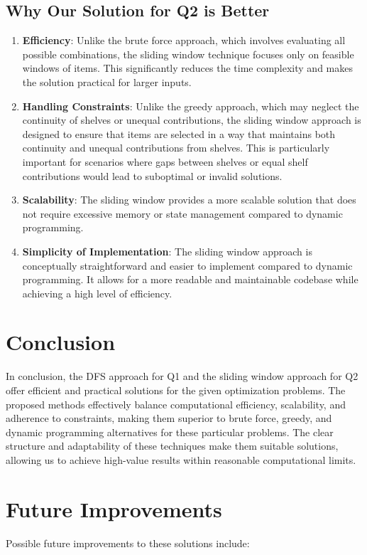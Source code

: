 \documentclass{article}
\begin{document}
\subsection{Why Our Solution for Q2 is Better}
\begin{enumerate}
    \item \textbf{Efficiency}: Unlike the brute force approach, which involves evaluating all possible combinations, the sliding window technique focuses only on feasible windows of items. This significantly reduces the time complexity and makes the solution practical for larger inputs.
    \item \textbf{Handling Constraints}: Unlike the greedy approach, which may neglect the continuity of shelves or unequal contributions, the sliding window approach is designed to ensure that items are selected in a way that maintains both continuity and unequal contributions from shelves. This is particularly important for scenarios where gaps between shelves or equal shelf contributions would lead to suboptimal or invalid solutions.
    \item \textbf{Scalability}: The sliding window provides a more scalable solution that does not require excessive memory or state management compared to dynamic programming.
    \item \textbf{Simplicity of Implementation}: The sliding window approach is conceptually straightforward and easier to implement compared to dynamic programming. It allows for a more readable and maintainable codebase while achieving a high level of efficiency.
\end{enumerate}

\section{Conclusion}
In conclusion, the DFS approach for Q1 and the sliding window approach for Q2 offer efficient and practical solutions for the given optimization problems. The proposed methods effectively balance computational efficiency, scalability, and adherence to constraints, making them superior to brute force, greedy, and dynamic programming alternatives for these particular problems. The clear structure and adaptability of these techniques make them suitable solutions, allowing us to achieve high-value results within reasonable computational limits.

\section{Future Improvements}
Possible future improvements to these solutions include:
\end{document}
